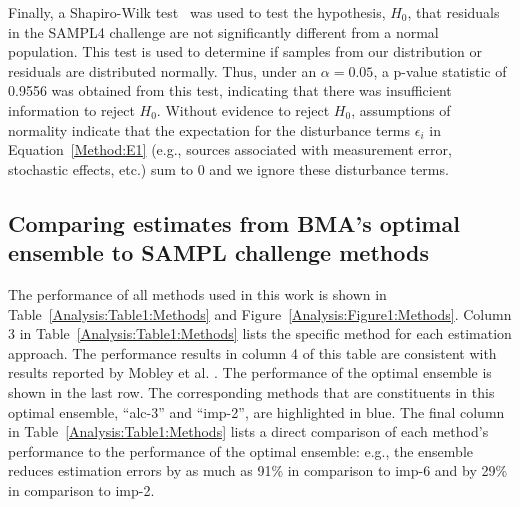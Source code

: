 \documentclass[journal=jpcbfk, manuscript=article]{achemso}
\newcommand{\+}[1]{\ensuremath{\mathbf{#1}}}
\begin{document}
Finally, a Shapiro-Wilk test~\cite{Shapiro:65} was used to test the hypothesis, $H_{0}$, that residuals in the SAMPL4 challenge are not significantly different from a normal population.
This test is used to determine if samples from our distribution or residuals are distributed normally.
Thus, under an $\alpha = 0.05$, a p-value statistic of 0.9556 was obtained from this test, indicating that there was insufficient information to reject $H_{0}$. 
Without evidence to reject $H_{0}$, assumptions of normality indicate that the expectation for the disturbance terms $\epsilon_i$ in Equation~\ref{Method:E1} (e.g., sources associated with measurement error, stochastic effects, etc.) sum to 0 and we ignore these disturbance terms.


\subsection{Comparing estimates from BMA's optimal ensemble to SAMPL challenge methods} \label{Results:BMA_Methods}
The performance of all methods used in this work is shown in Table~\ref{Analysis:Table1:Methods} and Figure~\ref{Analysis:Figure1:Methods}.
Column 3 in Table~\ref{Analysis:Table1:Methods} lists the specific method for each estimation approach.
The performance results in column 4 of this table are consistent with results reported by Mobley et al. \cite{Mobley:2014}.
The performance of the optimal ensemble is shown in the last row.
The corresponding methods that are constituents in this optimal ensemble, ``alc-3'' and ``imp-2'', are highlighted in blue.
The final column in Table~\ref{Analysis:Table1:Methods} lists a direct comparison of each method's performance to the performance of the optimal ensemble: e.g., the ensemble reduces estimation errors by as much as 91\% in comparison to imp-6 and by 29\% in comparison to imp-2. 
\end{document}
